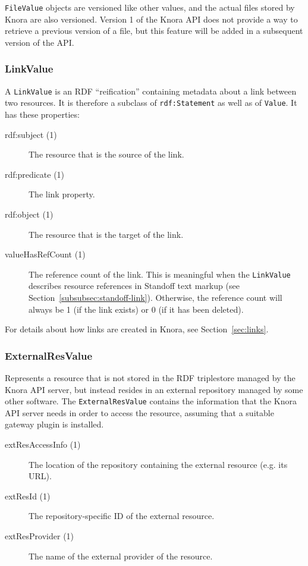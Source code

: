\documentclass[12pt, a4paper]{article}
\begin{document}
\texttt{FileValue} objects are versioned like other values, and the actual files stored by Knora are also versioned. Version 1 of the Knora API does not provide a way to retrieve a previous version of a file, but this feature will be added in a subsequent version of the API.

\subsubsection{LinkValue}

\label{subsubsec:linkvalue}

A \texttt{LinkValue} is an RDF \enquote{reification} containing metadata about a link between two resources. It is therefore a subclass of \texttt{rdf:Statement} as well as of \texttt{Value}. It has these properties:

\begin{description}
	\item[rdf:subject (1)] The resource that is the source of the link.
	\item[rdf:predicate (1)] The link property.
	\item[rdf:object (1)] The resource that is the target of the link.
	\item[valueHasRefCount (1)] The reference count of the link. This is meaningful when the \texttt{LinkValue} describes resource references in Standoff text markup (see Section~\ref{subsubsec:standoff-link}). Otherwise, the reference count will always be 1 (if the link exists) or 0 (if it has been deleted).
\end{description}

For details about how links are created in Knora, see Section~\ref{sec:links}.

\subsubsection{ExternalResValue}

Represents a resource that is not stored in the RDF triplestore managed by the Knora API server, but instead resides in an external repository managed by some other software. The \texttt{ExternalResValue} contains the information that the Knora API server needs in order to access the resource, assuming that a suitable gateway plugin is installed. 

\begin{description}
	\item[extResAccessInfo (1)] The location of the repository containing the external resource (e.g. its URL).
	\item[extResId (1)] The repository-specific ID of the external resource.
	\item[extResProvider (1)] The name of the external provider of the resource.
\end{description}
\end{document}
